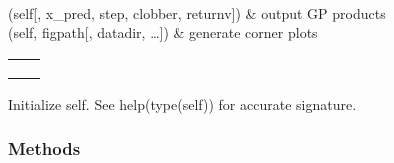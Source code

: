 \documentclass[letterpaper,10pt,english]{sphinxmanual}
\begin{document}
\begin{fulllineitems}
\begin{savenotes}
\begin{longtable}[c]{}
\hline
{}\\
\endfoot

\endlastfoot

(self{[}, x\_pred, step, clobber, returnv{]})
&
output GP products
\\
\hline
{}(self, figpath{[}, datadir, …{]})
&
generate corner plots
\\
\hline
\end{longtable}\sphinxatlongtableend\end{savenotes}


\begin{savenotes}\sphinxattablestart
\centering
\begin{tabulary}{\linewidth}[t]{|T|T|}
\hline

&\\
\hline
{}
&\\
\hline
{}
&\\
\hline
{}
&\\
\hline
\end{tabulary}
\par
\sphinxattableend\end{savenotes}

\begin{fulllineitems}
\label{\detokenize{generated/sdapy.gaussian_process.fit_gp:sdapy.gaussian_process.fit_gp.__init__}}
Initialize self.  See help(type(self)) for accurate signature.

\end{fulllineitems}

\subsubsection*{Methods}


\begin{savenotes}\sphinxatlongtablestart\begin{longtable}[c]{}
\hline


\end{longtable}
\end{savenotes}
\end{fulllineitems}
\end{document}
